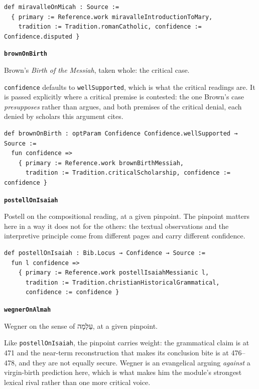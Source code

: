 \documentclass[11pt]{article}
\begin{document}
{\small\begin{verbatim}
def miravalleOnMicah : Source :=
  { primary := Reference.work miravalleIntroductionToMary,
    tradition := Tradition.romanCatholic, confidence := Confidence.disputed }
\end{verbatim}}
\par\medskip\noindent\textbf{\texttt{brown\allowbreak{}On\allowbreak{}Birth}}\par\nobreak\noindent
Brown’s \emph{Birth of the Messiah}, taken whole: the critical case.

\texttt{confidence} defaults to \texttt{well\allowbreak{}Supported}, which is what the critical readings are. It is passed explicitly where a critical premise is contested: the one Brown’s case \emph{presupposes} rather than argues, and both premises of the critical denial, each denied by scholars this argument cites.

{\small\begin{verbatim}
def brownOnBirth : optParam Confidence Confidence.wellSupported → Source :=
  fun confidence =>
    { primary := Reference.work brownBirthMessiah,
      tradition := Tradition.criticalScholarship, confidence := confidence }
\end{verbatim}}
\par\medskip\noindent\textbf{\texttt{postell\allowbreak{}On\allowbreak{}Isaiah}}\par\nobreak\noindent
Postell on the compositional reading, at a given pinpoint. The pinpoint matters here in a way it does not for the others: the textual observations and the interpretive principle come from different pages and carry different confidence.

{\small\begin{verbatim}
def postellOnIsaiah : Bib.Locus → Confidence → Source :=
  fun l confidence =>
    { primary := Reference.work postellIsaiahMessianic l,
      tradition := Tradition.christianHistoricalGrammatical,
      confidence := confidence }
\end{verbatim}}
\par\medskip\noindent\textbf{\texttt{wegner\allowbreak{}On\allowbreak{}Almah}}\par\nobreak\noindent
Wegner on the sense of עַלְמָה, at a given pinpoint.

Like \texttt{postell\allowbreak{}On\allowbreak{}Isaiah}, the pinpoint carries weight: the grammatical claim is at 471 and the near-term reconstruction that makes its conclusion bite is at 476–478, and they are not equally secure. Wegner is an evangelical arguing \emph{against} a virgin-birth prediction here, which is what makes him the module’s strongest lexical rival rather than one more critical voice.
\end{document}
